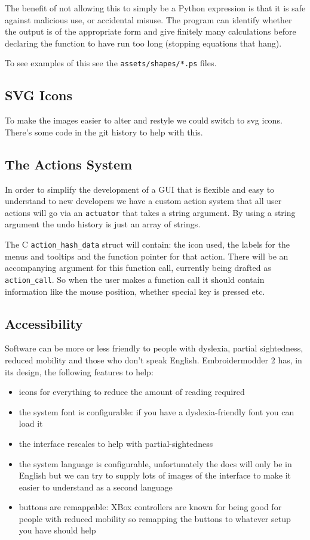 \documentclass[a4paper]{report}
\begin{document}
The benefit of not allowing this to simply be a Python expression is that it is safe against
malicious use, or accidental misuse. The program can identify whether the output is of the
appropriate form and give finitely many calculations before declaring the function to have run
too long (stopping equations that hang).

To see examples of this see the \texttt{assets/shapes/*.ps} files.

\subsection{SVG Icons}

To make the images easier to alter and restyle we could switch to svg icons.
There's some code in the git history to help with this.

\subsection{The Actions System}

In order to simplify the development of a GUI that is flexible and easy to
understand to new developers we have a custom action system that all user
actions will go via an \texttt{actuator} that takes a string argument. By using a
string argument the undo history is just an array of strings.

The C \texttt{action\_hash\_data} struct will contain: the icon used, the
labels for the menus and tooltips and the function pointer for that action.
There will be an accompanying argument for this function call, currently being
drafted as \texttt{action\_call}. So when the user makes a function call it should
contain information like the mouse position, whether special key is pressed etc.

\subsection{Accessibility}

Software can be more or less friendly to people with dyslexia, partial
sightedness, reduced mobility and those who don't speak English. Embroidermodder
2 has, in its design, the following features to help:

\begin{itemize}
\item icons for everything to reduce the amount of reading required
\item the system font is configurable: if you have a dyslexia-friendly font you
    can load it
\item the interface rescales to help with partial-sightedness
\item the system language is configurable, unfortunately the docs will only be
    in English but we can try to supply lots of images of the interface to make it
    easier to understand as a second language
\item buttons are remappable: XBox controllers are known for being good for
    people with reduced mobility so remapping the buttons to whatever setup you have
    should help
\end{itemize}
\end{document}
